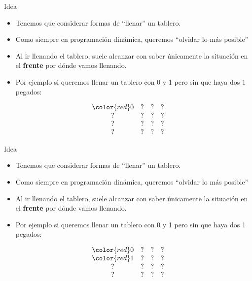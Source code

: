\documentclass{beamer}
\begin{document}
\begin{frame}{Idea}
    \begin{itemize}
		\item Tenemos que considerar formas de ``llenar'' un tablero.
		\item Como siempre en programación dinámica, queremos ``olvidar lo más posible''
		\item Al ir llenando el tablero, suele alcanzar con saber únicamente la situación en el \textbf{frente} por dónde vamos llenando.
		\item Por ejemplo si queremos llenar un tablero con 0 y 1 pero sin que haya dos 1 pegados:
    \end{itemize}
    $$\begin{array}{cccc}
		\color{red}0 & ? & ? & ? \\
		? & ? & ? & ? \\
		? & ? & ? & ? \\
		? & ? & ? & ? \\
    \end{array}$$
\end{frame}

\begin{frame}{Idea}
    \begin{itemize}
		\item Tenemos que considerar formas de ``llenar'' un tablero.
		\item Como siempre en programación dinámica, queremos ``olvidar lo más posible''
		\item Al ir llenando el tablero, suele alcanzar con saber únicamente la situación en el \textbf{frente} por dónde vamos llenando.
		\item Por ejemplo si queremos llenar un tablero con 0 y 1 pero sin que haya dos 1 pegados:
    \end{itemize}
    $$\begin{array}{cccc}
		\color{red}0 & ? & ? & ? \\
		\color{red}1 & ? & ? & ? \\
		? & ? & ? & ? \\
		? & ? & ? & ? \\
    \end{array}$$
\end{frame}
\end{document}
